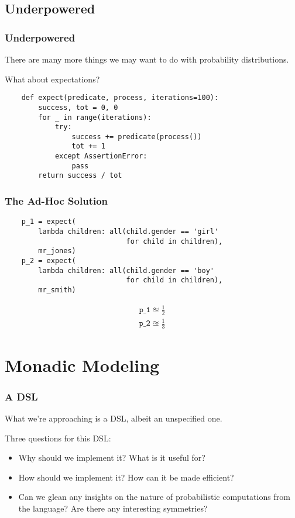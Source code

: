 \documentclass[usenames,dvipsnames]{beamer}
\begin{document}
\subsection{Underpowered}
\begin{frame}[fragile]
  \frametitle{Underpowered}
  There are many more things we may want to do with probability distributions.

  What about expectations?
  \begin{verbatim}
    def expect(predicate, process, iterations=100):
        success, tot = 0, 0
        for _ in range(iterations):
            try:
                success += predicate(process())
                tot += 1
            except AssertionError:
                pass
        return success / tot
  \end{verbatim}
\end{frame}
\begin{frame}[fragile]
  \frametitle{The Ad-Hoc Solution}
  \begin{verbatim}
    p_1 = expect(
        lambda children: all(child.gender == 'girl'
                             for child in children),
        mr_jones)
    p_2 = expect(
        lambda children: all(child.gender == 'boy'
                             for child in children),
        mr_smith)
  \end{verbatim}
  \begin{gather*}
    \texttt{p_1} \approxeq \frac{1}{2} \\
    \texttt{p_2} \approxeq \frac{1}{3}
  \end{gather*}
\end{frame}
\section{Monadic Modeling}
\begin{frame}
  \frametitle{A DSL}
  What we're approaching is a DSL, albeit an unspecified one.

  \pause
  Three questions for this DSL:
  \pause
  \begin{itemize}
    \item Why should we implement it? What is it useful for?
    \pause
    \item How should we implement it? How can it be made efficient? 
    \pause
    \item Can we glean any insights on the nature of probabilistic computations
      from the language? Are there any interesting symmetries?
  \end{itemize}
\end{frame}
\end{document}
